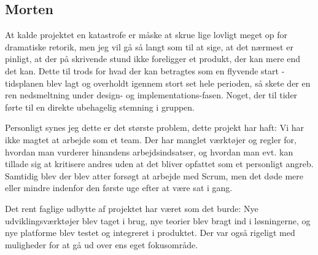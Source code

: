 \subsection{Morten}

At kalde projektet en katastrofe er måske at skrue lige lovligt meget op for dramatiske retorik, men jeg vil gå så langt som til at sige, at det nærmest er pinligt, at der på skrivende stund ikke foreligger et produkt, der kan mere end det kan. Dette til trods for hvad der kan betragtes som en flyvende start - tidsplanen blev lagt og overholdt igennem stort set hele perioden, så skete der en ren nedsmeltning under design- og implementations-fasen. Noget, der til tider førte til en direkte ubehagelig stemning i gruppen.

Personligt synes jeg dette er det største problem, dette projekt har haft: Vi har ikke magtet at arbejde som et team. Der har manglet værktøjer og regler for, hvordan man vurderer hinandens arbejdsindsatser, og hvordan man evt. kan tillade sig at kritisere andres uden at det bliver opfattet som et personligt angreb. Samtidig blev der blev atter forsøgt at arbejde med Scrum, men det døde mere eller mindre indenfor den første uge efter at være sat i gang.

Det rent faglige udbytte af projektet har været som det burde: Nye udviklingsværktøjer blev taget i brug, nye teorier blev bragt ind i løsningerne, og nye platforme blev testet og integreret i produktet. Der var også rigeligt med muligheder for at gå ud over ens eget fokusområde.